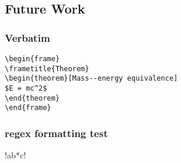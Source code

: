 \subsection{Future Work}


\begin{frame}[fragile] %
\frametitle{Verbatim}
\begin{example}
\begin{verbatim}
\begin{frame}
\frametitle{Theorem}
\begin{theorem}[Mass--energy equivalence]
$E = mc^2$
\end{theorem}
\end{frame}\end{verbatim}
\end{example}
\end{frame}


\begin{frame}[fragile]
\frametitle{regex formatting test}
\cverb!ab*c!
\end{frame}


